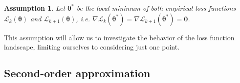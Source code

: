 \documentclass{article}
\newtheorem{assumption}{Assumption}
\begin{document}
\begin{assumption}\label{assumpt}
    Let $\boldsymbol{\theta}^*$ be the local minimum of both empirical loss functions $\mathcal{L}_{k}(\boldsymbol{\theta})$ and $\mathcal{L}_{k+1}(\boldsymbol{\theta})$, i.e. $\nabla \mathcal{L}_{k}(\boldsymbol{\theta}^*) = \nabla \mathcal{L}_{k+1}(\boldsymbol{\theta}^*) = \mathbf{0}$.
\end{assumption}

This assumption will allow us to investigate the behavior of the loss function landscape, limiting ourselves to considering just one point. 

\subsection{Second-order approximation} 
\end{document}

